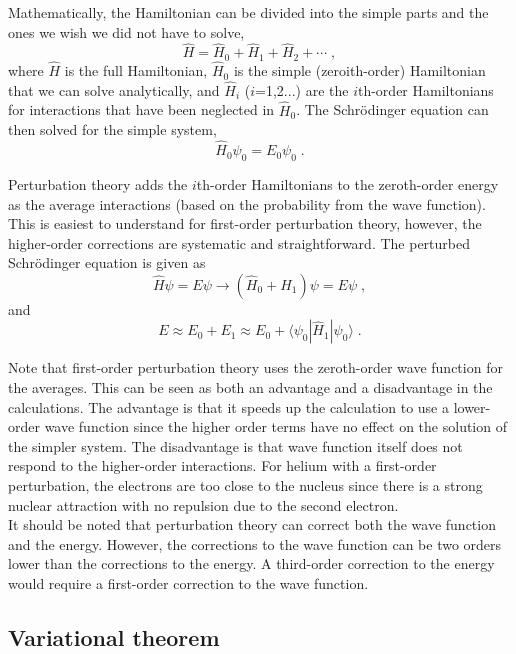 \documentclass[12pt]{report}
\begin{document}
Mathematically, the Hamiltonian can be divided into the simple parts and the
ones we wish we did not have to solve,
\begin{equation}
 \hat H = \hat H_0+\hat H_1+\hat H_2+\cdots \; ,
\end{equation}
where $\hat H$ is the full Hamiltonian, $\hat H_0$ is the simple
(zeroith-order) Hamiltonian that we can solve analytically, and $\hat H_i$
($i$=1,2...) are the $i$th-order Hamiltonians for interactions that have been
neglected in $\hat H_0$. The Schr\"{o}dinger equation can then solved for the
simple system,
\begin{equation}
 \hat H_0\psi_0=E_0\psi_0 \; .
\end{equation}

Perturbation theory adds the $i$th-order Hamiltonians to the zeroth-order
energy as the average interactions (based on the probability from the
wave function). This is easiest to understand for first-order perturbation
theory, however, the higher-order corrections are systematic and
straightforward. The perturbed Schr\"{o}dinger equation is given as
\begin{equation}
 \hat H\psi=E\psi \to (\hat H_0 + \hat H_1)\psi = E\psi \; , 
\end{equation}
and
\begin{equation}
 E \approx E_0 + E_1 \approx E_0 + \langle\psi_0|\hat H_1|\psi_0\rangle \; .
\end{equation}

Note that first-order perturbation theory uses the zeroth-order wave 
function for the averages. This can be seen as both an advantage and a
disadvantage in the calculations. The advantage is that it speeds up the
calculation to use a lower-order wave function since the higher order terms
have no effect on the solution of the simpler system. The disadvantage is that
wave function itself does not respond to the higher-order interactions. For
helium with a first-order perturbation, the electrons are too close to the
nucleus since there is a strong nuclear attraction with no repulsion due to
the second electron. \\

It should be noted that perturbation theory can correct both the wave function
and the energy. However, the corrections to the wave function can be two orders
lower than the corrections to the energy. A third-order correction to the
energy would require a first-order correction to the wave function.

\subsection{Variational theorem}
\end{document}
